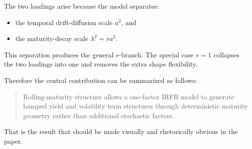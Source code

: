 \documentclass[11pt]{article}
\theoremstyle{plainbreak}
\begin{document}
The two loadings arise because the model separates:
\begin{itemize}
    \item the temporal drift-diffusion scale \(a^2\), and
    \item the maturity-decay scale \(\lambda^2=ra^2\).
\end{itemize}

This separation produces the general \(r\)-branch. The special case \(r=1\) collapses the two loadings into one and removes the extra shape flexibility.

Therefore the central contribution can be summarized as follows:
\begin{quote}
Rolling-maturity structure allows a one-factor IRFR model to generate humped yield and volatility term structures through deterministic maturity geometry rather than additional stochastic factors.
\end{quote}

That is the result that should be made visually and rhetorically obvious in the paper.
\end{document}
